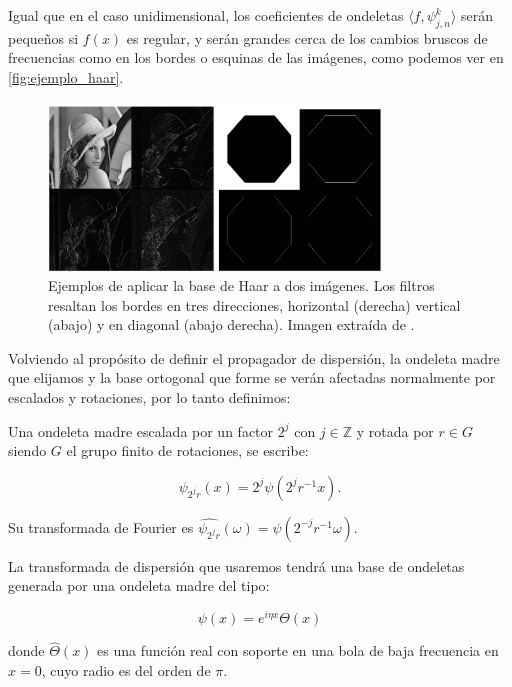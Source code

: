 \noindent Igual que en el caso unidimensional, los coeficientes de ondeletas $\langle f,\psi_{j,n}^k \rangle$ serán pequeños si $f(x)$ es regular, y serán grandes cerca de los cambios bruscos de frecuencias como en los bordes o esquinas de las imágenes, como podemos ver en \autoref{fig:ejemplo_haar}.

\begin{figure} [!h]
  \centering
  \includegraphics[width=0.8\textwidth]{img/ejemplos_haar_basis.png}
  \caption{Ejemplos de aplicar la base de Haar a dos imágenes. Los filtros resaltan los bordes en tres direcciones, horizontal (derecha) vertical (abajo) y en diagonal (abajo derecha). Imagen extraída de \cite{HaarBasis}.}
  \label{fig:ejemplo_haar}
\end{figure}

\medskip 

\noindent Volviendo al propósito de definir el propagador de dispersión, la ondeleta madre que elijamos y la base ortogonal que forme se verán afectadas normalmente por escalados y rotaciones, por lo tanto definimos: 

\begin{definicion}
  Una ondeleta madre escalada por un factor $2^{j}$ con $j \in \mathbb{Z}$ y rotada por $r \in G$ siendo $G$ el grupo finito de rotaciones, se escribe: 

  $$\psi_{2^j r}(x)=2^{j} \psi(2^j r^{-1} x).$$
\end{definicion}


\medskip

\noindent Su transformada de Fourier es $\widehat{\psi_{2^j r}}(\omega)=\widehat{\psi}(2^{-j} r^{-1} \omega)$.

\medskip

\noindent La transformada de dispersión que usaremos tendrá una base de ondeletas generada por una ondeleta madre del tipo:

$$\psi(x)=e^{i\eta x} \Theta(x)$$

\noindent donde $\widehat{\Theta}(x)$ es una función real con soporte en una bola de baja frecuencia en $x=0$, cuyo radio es del orden de $\pi$.

